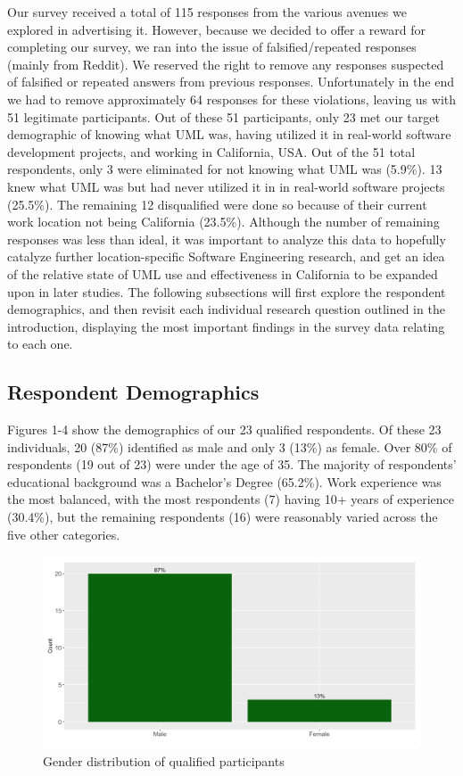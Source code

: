 \documentclass[letterpaper, 10 pt, conference]{ieeeconf}  %
\begin{document}
Our survey received a total of 115 responses from the various avenues we explored in advertising it. However, because we decided to offer a reward for completing our survey, we ran into the issue of falsified/repeated responses (mainly from Reddit). We reserved the right to remove any responses suspected of falsified or repeated answers from previous responses. Unfortunately in the end we had to remove approximately 64 responses for these violations, leaving us with 51 legitimate participants. Out of these 51 participants, only 23 met our target demographic of knowing what UML was, having utilized it in real-world software development projects, and working in California, USA. Out of the 51 total respondents, only 3 were eliminated for not knowing what UML was (5.9\%). 13 knew what UML was but had never utilized it in in real-world software projects (25.5\%). The remaining 12 disqualified were done so because of their current work location not being California (23.5\%). Although the number of remaining responses was less than ideal, it was important to analyze this data to hopefully catalyze further location-specific Software Engineering research, and get an idea of the relative state of UML use and effectiveness in California to be expanded upon in later studies. The following subsections will first explore the respondent demographics, and then revisit each individual research question outlined in the introduction, displaying the most important findings in the survey data relating to each one.

\subsection{Respondent Demographics}

Figures 1-4 show the demographics of our 23 qualified respondents. Of these 23 individuals, 20 (87\%) identified as male and only 3 (13\%) as female. Over 80\% of respondents (19 out of 23) were under the age of 35. 
The majority of respondents' educational background was a Bachelor's Degree (65.2\%). Work experience was the most balanced, with the most respondents (7) having 10+ years of experience (30.4\%), but the remaining respondents (16) were reasonably varied across the five other categories.

	\begin{figure}[!htb]
      \centering
      \includegraphics[scale=0.25]{Plots/GenderPlot}
      \caption{Gender distribution of qualified participants}
      \label{GenderPlot}
   \end{figure}
   
\end{document}
